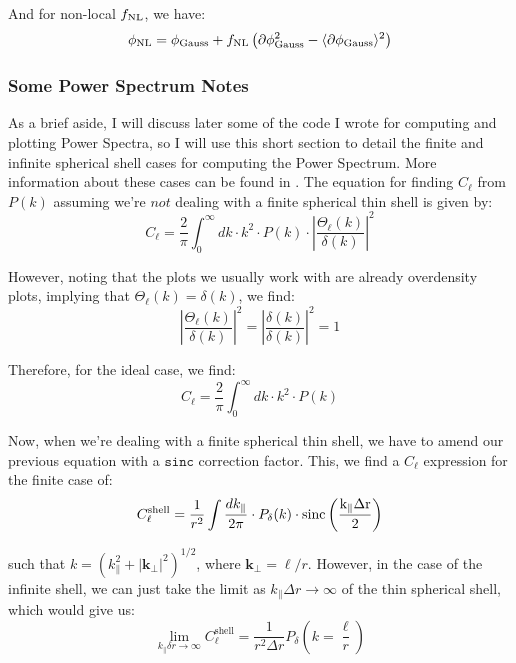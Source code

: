 \documentclass[11pt]{article}
\renewcommand{\_}[1]{\underline{ #1 }}
\newcommand{\npar}{\vspace{.3cm}\newline}
\begin{document}
{And for non-local $f_{\rm NL}$, we have:
\begin{equation}
    \phi_{\rm NL} = \phi_{\rm Gauss} + f_{\rm NL}\left(\partial\phi_{\rm Gauss}^2 - \langle \partial \phi_{\rm Gauss} \rangle^2 \right)
\end{equation}

\subsubsection{Some Power Spectrum Notes}\label{powerspecnotes}

As a brief aside, I will discuss later some of the code I wrote for computing and plotting Power Spectra, so I will use this short section to detail the finite and infinite spherical shell cases for computing the Power Spectrum. More information about these cases can be found in \cite{Takahashi_2017}.
\npar
The equation for finding $C_{\ell}$ from $P(k)$ assuming we're $\textit{not}$ dealing with a finite spherical thin shell is given by:
\begin{equation}
    C_{\ell} = \frac{2}{\pi}\int_0^{\infty} dk\cdot k^2\cdot P(k)\cdot \left|\frac{\Theta_{\ell}(k)}{\delta(k)} \right|^2
\end{equation}

However, noting that the plots we usually work with are already overdensity plots, implying that $\Theta_{\ell}(k)=\delta(k)$, we find:
\begin{equation}
    \left| \frac{\Theta_{\ell}(k)}{\delta(k)}\right|^2 = \left|\frac{\delta(k)}{\delta(k)}\right|^2 = 1
\end{equation}

Therefore, for the ideal case, we find:
\begin{equation}
    C_{\ell} = \frac{2}{\pi}\int_0^{\infty} dk\cdot k^2\cdot P(k)
\end{equation}

Now, when we're dealing with a finite spherical thin shell, we have to amend our previous equation with a $\texttt{sinc}$ correction factor. This, we find a $C_{\ell}$ expression for the finite case of:
\begin{equation}
    C_{\ell}^{\text{shell}} = \frac1{r^2} \int \frac{dk_{\parallel}}{2\pi}\cdot P_{\delta}(k)\cdot \rm{sinc}\left(\frac{k_{\parallel}\Delta r}{2}\right)
\end{equation}

such that $k = (k_{\parallel}^2 + |\mathbf{k}_{\perp}|^2)^{1/2}$, where $\mathbf{k}_{\perp} = \ell/r$. However, in the case of the infinite shell, we can just take the limit as $k_{\parallel}\Delta r\to\infty$ of the thin spherical shell, which would give us:
\begin{equation}
    \lim_{k_{\parallel}\delta r\to\infty} C_{\ell}^{\text{shell}} = \frac{1}{r^2\Delta r} P_{\delta}\left(k=\frac{\ell}{r}\right)
\end{equation}

}
\end{document}
